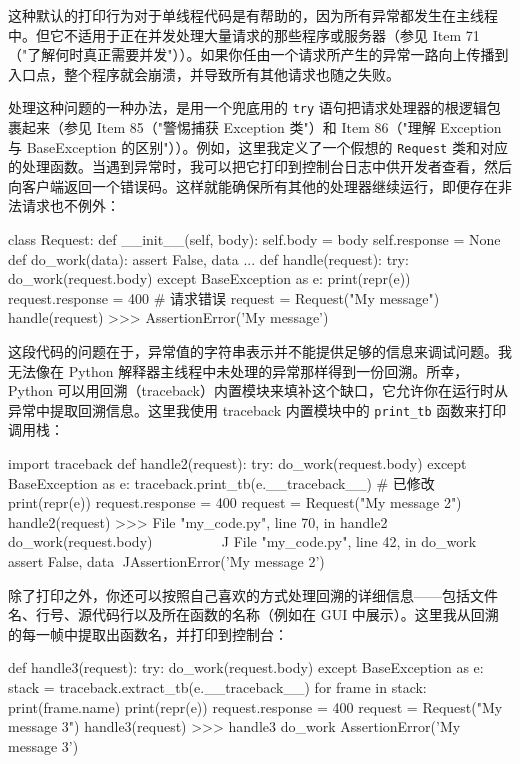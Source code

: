 这种默认的打印行为对于单线程代码是有帮助的，因为所有异常都发生在主线程中。但它不适用于正在并发处理大量请求的那些程序或服务器（参见 Item 71（"了解何时真正需要并发"））。如果你任由一个请求所产生的异常一路向上传播到入口点，整个程序就会崩溃，并导致所有其他请求也随之失败。

处理这种问题的一种办法，是用一个兜底用的 \texttt{try} 语句把请求处理器的根逻辑包裹起来（参见 Item 85（"警惕捕获 Exception 类"）和 Item 86（"理解 Exception 与 BaseException 的区别"））。例如，这里我定义了一个假想的 \texttt{Request} 类和对应的处理函数。当遇到异常时，我可以把它打印到控制台日志中供开发者查看，然后向客户端返回一个错误码。这样就能确保所有其他的处理器继续运行，即便存在非法请求也不例外：

\begin{codebox}[python]
class Request:
    def __init__(self, body):
        self.body = body
        self.response = None
def do_work(data):
    assert False, data
    ...
def handle(request):
    try:
        do_work(request.body)
    except BaseException as e:
        print(repr(e))
        request.response = 400  # 请求错误
request = Request("My message")
handle(request)
>>>
AssertionError('My message')
\end{codebox}

这段代码的问题在于，异常值的字符串表示并不能提供足够的信息来调试问题。我无法像在 Python 解释器主线程中未处理的异常那样得到一份回溯。所幸，Python 可以用回溯（traceback）内置模块来填补这个缺口，它允许你在运行时从异常中提取回溯信息。这里我使用 traceback 内置模块中的 \texttt{print\_tb} 函数来打印调用栈：

\begin{codebox}[python]
import traceback
def handle2(request):
    try:
        do_work(request.body)
    except BaseException as e:
        traceback.print_tb(e.__traceback__)  # 已修改
        print(repr(e))
        request.response = 400
request = Request("My message 2")
handle2(request)
>>>
  File "my_code.py", line 70, in handle2
    do_work(request.body)
    ~~~~~~~^^^^^^^^^^^^^^
  File "my_code.py", line 42, in do_work
    assert False, data
           ^^^^^
AssertionError('My message 2')
\end{codebox}

除了打印之外，你还可以按照自己喜欢的方式处理回溯的详细信息——包括文件名、行号、源代码行以及所在函数的名称（例如在 GUI 中展示）。这里我从回溯的每一帧中提取出函数名，并打印到控制台：

\begin{codebox}[python]
def handle3(request):
    try:
        do_work(request.body)
    except BaseException as e:
        stack = traceback.extract_tb(e.__traceback__)
        for frame in stack:
            print(frame.name)
        print(repr(e))
        request.response = 400
request = Request("My message 3")
handle3(request)
>>>
handle3
do_work
AssertionError('My message 3')
\end{codebox}


